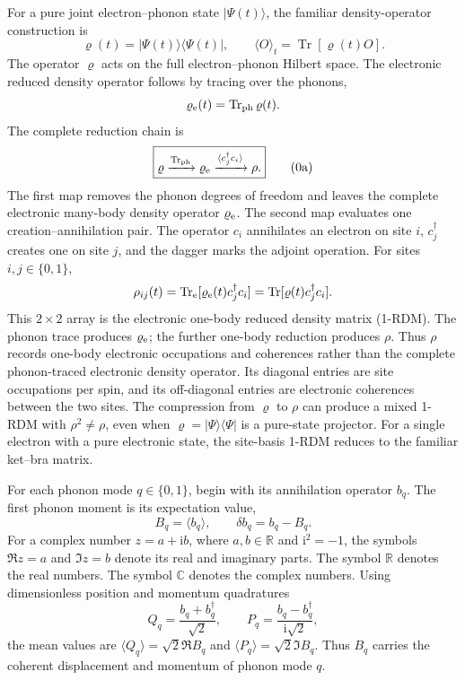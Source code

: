 \documentclass[10pt,letterpaper,twocolumn]{article}
\newcommand{\R}{\mathbb R}
\newcommand{\C}{\mathbb C}
\newcommand{\ii}{\mathrm i}
\begin{document}
For a pure joint electron--phonon state \(\lvert\Psi(t)\rangle\), the familiar
density-operator construction is
\[
\varrho(t)=\lvert\Psi(t)\rangle\langle\Psi(t)\rvert,
\qquad
\langle O\rangle_t=\operatorname{Tr}[\varrho(t)O].
\]
The operator \(\varrho\) acts on the full electron--phonon Hilbert space.  The
electronic reduced density operator follows by tracing over the phonons,
\[
\varrho_{\rm e}(t)=\operatorname{Tr}_{\rm ph}\varrho(t).
\]
The complete reduction chain is
\[
\boxed{
\varrho
\xrightarrow{\operatorname{Tr}_{\rm ph}}
\varrho_{\rm e}
\xrightarrow{\langle c_j^\dagger c_i\rangle}
\rho.}
\tag{0a}
\]
The first map removes the phonon degrees of freedom and leaves the complete
electronic many-body density operator \(\varrho_{\rm e}\).  The second map
evaluates one creation--annihilation pair.  The operator \(c_i\) annihilates an
electron on site \(i\), \(c_j^\dagger\) creates one on site \(j\), and the
dagger marks the adjoint operation.  For sites \(i,j\in\{0,1\}\),
\[
\rho_{ij}(t)
=\operatorname{Tr}_{\rm e}[\varrho_{\rm e}(t)c_j^\dagger c_i]
=\operatorname{Tr}[\varrho(t)c_j^\dagger c_i].
\]
This \(2\times2\) array is the electronic one-body reduced density matrix
(1-RDM).  The phonon trace produces \(\varrho_{\rm e}\); the further one-body
reduction produces \(\rho\).  Thus \(\rho\) records one-body electronic
occupations and coherences rather than the complete phonon-traced electronic
density operator.  Its diagonal entries are site occupations per spin, and its
off-diagonal entries are electronic coherences between the two sites.  The
compression from \(\varrho\) to \(\rho\) can produce a mixed 1-RDM with
\(\rho^2\neq\rho\), even when \(\varrho=\lvert\Psi\rangle\langle\Psi\rvert\)
is a pure-state projector.  For a single electron with a pure electronic
state, the site-basis 1-RDM reduces to the familiar ket--bra matrix.

For each phonon mode \(q\in\{0,1\}\), begin with its annihilation operator
\(b_q\).  The first phonon moment is its expectation value,
\[
B_q=\langle b_q\rangle,
\qquad
\delta b_q=b_q-B_q.
\tag{1}
\]
For a complex number \(z=a+\ii b\), where \(a,b\in\R\) and
\(\ii^2=-1\), the symbols \(\Re z=a\) and \(\Im z=b\) denote its real and
imaginary parts.  The symbol \(\R\) denotes the real numbers.
The symbol \(\C\) denotes the complex numbers.
Using dimensionless position and momentum quadratures
\[
Q_q=\frac{b_q+b_q^\dagger}{\sqrt2},
\qquad
P_q=\frac{b_q-b_q^\dagger}{\ii\sqrt2},
\]
the mean values are \(\langle Q_q\rangle=\sqrt2\Re B_q\) and
\(\langle P_q\rangle=\sqrt2\Im B_q\).  Thus \(B_q\) carries the coherent
displacement and momentum of phonon mode \(q\).
\end{document}
